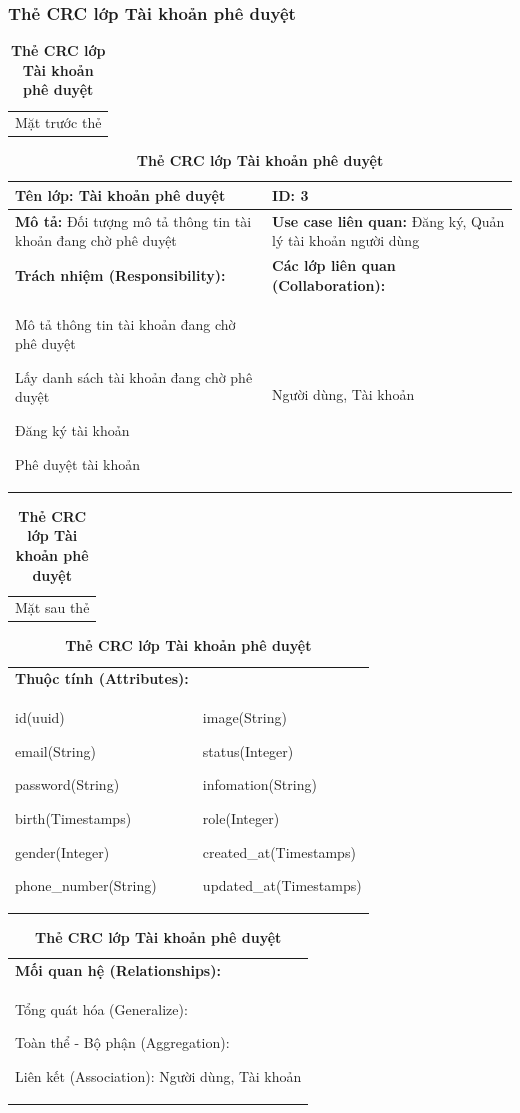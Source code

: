 \subsubsection{Thẻ CRC lớp Tài khoản phê duyệt}
  \begin{table}[H]
    \caption{\bfseries \fontsize{12pt}{0pt}\selectfont Thẻ CRC lớp Tài khoản phê duyệt}
    \centering
    \begin{tabularx}{0.9\textwidth}{X}
      Mặt trước thẻ
    \end{tabularx}
    \begin{tabularx}{0.9\textwidth}{|X|X|}
      \hline
      \textbf{Tên lớp:} Tài khoản phê duyệt & \textbf{ID:} 3 \\
      \hline
      \textbf{Mô tả:} Đối tượng mô tả thông tin tài khoản đang chờ phê duyệt & \textbf{Use case liên quan:} Đăng ký, Quản lý tài khoản người dùng \\
      \hline
      \textbf{Trách nhiệm (Responsibility):} & \textbf{Các lớp liên quan (Collaboration):} \\
      Mô tả thông tin tài khoản đang chờ phê duyệt

      Lấy danh sách tài khoản đang chờ phê duyệt
      
      Đăng ký tài khoản

      Phê duyệt tài khoản
      & 
      Người dùng, Tài khoản
      \\
      \hline
    \end{tabularx}
    \begin{tabularx}{0.9\textwidth}{X}
      Mặt sau thẻ
    \end{tabularx}
    \begin{tabularx}{0.9\textwidth}{|X|X|}
      \hline
      \textbf{Thuộc tính (Attributes):} & \\
      id(uuid) 
      
      email(String)

      password(String)

      birth(Timestamps)

      gender(Integer)

      phone\_number(String)
      &
      image(String)

      status(Integer)

      infomation(String)

      role(Integer)

      created\_at(Timestamps)

      updated\_at(Timestamps)
      \\
      \hline
    \end{tabularx}
    \begin{tabularx}{0.9\textwidth}{|X|}
      \textbf{Mối quan hệ (Relationships):} \\
      Tổng quát hóa (Generalize):  

      Toàn thể - Bộ phận (Aggregation):   
      
      Liên kết (Association): Người dùng, Tài khoản 
      \\
      \hline
    \end{tabularx}
  \end{table}

